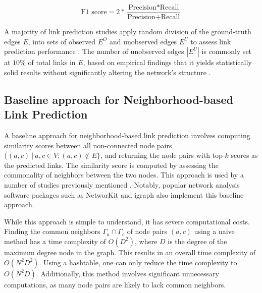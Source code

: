 \begin{equation}
\label{eq:f1score}
  \text{F1 score} = 2 * \frac{\text{Precision} * \text{Recall}}{\text{Precision} + \text{Recall}}
\end{equation}

A majority of link prediction studies apply random division of the ground-truth edges $E$, into sets of observed $E^O$ and unobserved edges $E^U$ to assess link prediction performance \cite{zhou2021progresses}. The number of unobserved edges $|E^U|$ is commonly set at $10\%$ of total links in $E$, based on empirical findings that it yields statistically solid results without significantly altering the network's structure \cite{lu2015toward}.




\subsection{Baseline approach for Neighborhood-based Link Prediction}

A baseline approach for neighborhood-based link prediction involves computing similarity scores between all non-connected node pairs $\{(a, c)\ |\ a, c \in V; (a, c) \notin E\}$, and returning the node pairs with top-$k$ scores as the predicted links. The similarity score is computed by assessing the commonality of neighbors between the two nodes. This approach is used by a number of studies previously mentioned \cite{gatadi2023lpcd, saifi2023fast, benhidour2022approach, mumin2022efficient, rafiee2020cndp, guo2019node, yang2015new, papadimitriou2012fast, wang2019link}. Notably, popular network analysis software packages such as NetworKit \cite{staudt2016networkit} and igraph \cite{csardi2006igraph} also implement this baseline approach.

While this approach is simple to understand, it has severe computational costs. Finding the common neighbors $\Gamma_a \cap \Gamma_c$ of node pairs $(a, c)$ using a naive method has a time complexity of $O(D^2)$, where $D$ is the degree of the maximum degree node in the graph. This results in an overall time complexity of $O(N^2D^2)$. Using a hashtable, one can only reduce the time complexity to $O(N^2D)$. Additionally, this method involves significant unnecessary computations, as many node pairs are likely to lack common neighbors.
